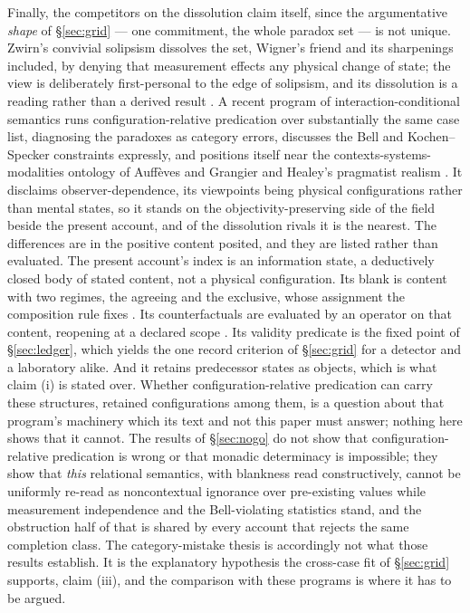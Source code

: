 Finally, the competitors on the dissolution claim itself, since the argumentative \emph{shape} of \S\ref{sec:grid} --- one commitment, the whole paradox set --- is not unique. Zwirn's convivial solipsism dissolves the set, Wigner's friend and its sharpenings included, by denying that measurement effects any physical change of state; the view is deliberately first-personal to the edge of solipsism, and its dissolution is a reading rather than a derived result \cite{zwirn2023convivial}. A recent program of interaction-conditional semantics runs configuration-relative predication over substantially the same case list, diagnosing the paradoxes as category errors, discusses the Bell and Kochen--Specker constraints expressly, and positions itself near the contexts-systems-modalities ontology of Auff\`eves and Grangier and Healey's pragmatist realism \cite{ics2026dissolution, auffeves2016contexts, healey2012quantum}. It disclaims observer-dependence, its viewpoints being physical configurations rather than mental states, so it stands on the objectivity-preserving side of the field beside the present account, and of the dissolution rivals it is the nearest. The differences are in the positive content posited, and they are listed rather than evaluated. The present account's index is an information state, a deductively closed body of stated content, not a physical configuration. Its blank is content with two regimes, the agreeing and the exclusive, whose assignment the composition rule fixes \cite{AethusUnion}. Its counterfactuals are evaluated by an operator on that content, reopening at a declared scope \cite{AethusSemantics}. Its validity predicate is the fixed point of \S\ref{sec:ledger}, which yields the one record criterion of \S\ref{sec:grid} for a detector and a laboratory alike. And it retains predecessor states as objects, which is what claim (i) is stated over. Whether configuration-relative predication can carry these structures, retained configurations among them, is a question about that program's machinery which its text and not this paper must answer; nothing here shows that it cannot. The results of \S\ref{sec:nogo} do not show that configuration-relative predication is wrong or that monadic determinacy is impossible; they show that \emph{this} relational semantics, with blankness read constructively, cannot be uniformly re-read as noncontextual ignorance over pre-existing values while measurement independence and the Bell-violating statistics stand, and the obstruction half of that is shared by every account that rejects the same completion class. The category-mistake thesis is accordingly not what those results establish. It is the explanatory hypothesis the cross-case fit of \S\ref{sec:grid} supports, claim (iii), and the comparison with these programs is where it has to be argued.


